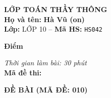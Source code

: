 \noindent
\begin{tcolorbox}[colback=white,colframe=black,arc=0mm,boxrule=0.8pt,top=4pt,bottom=4pt,left=6pt,right=6pt]
	\begin{minipage}[c]{0.44\textwidth}
		{\bfseries\large LỚP TOÁN THẦY THÔNG}\\[3pt]
		\textbf{Họ và tên:} \textbf{\large Hà Vũ (on)}\\[3pt]
		\textbf{Lớp:} LỚP 10 \quad -- \quad \textbf{Mã HS:} \texttt{HS042}
	\end{minipage}
	\hfill
	\begin{minipage}[c]{0.22\textwidth}
		\begin{tcolorbox}[colback=white,colframe=black,arc=0mm,boxrule=0.6pt,height=1.8cm,halign=center,valign=top,top=2pt]
			{\bfseries\normalsize Điểm}
		\end{tcolorbox}
	\end{minipage}
	\hfill
	\begin{minipage}[c]{0.30\textwidth}
		\raggedleft
		\textit{Thời gian làm bài: 30 phút}\\[4pt]
		\textbf{Mã đề thi:} 
	\end{minipage}
\end{tcolorbox}
\vspace{0.25cm}

\noindent\textbf{\large ĐỀ BÀI (MÃ ĐỀ: 010)}
\vspace{0.1cm}

